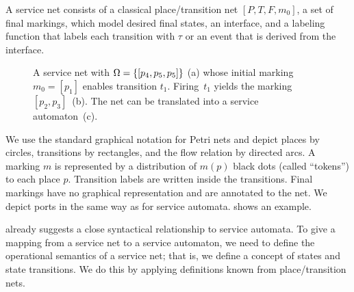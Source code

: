 A service net consists of a classical place/transition net $[P,T,F,m_0]$, a set of final markings, which model desired final states, an interface, and a labeling function that labels each transition with $\tau$ or an event that is derived from the interface.

\begin{figure}
\centering
{}\hfill
{}\hfill
{}
\caption{A service net with $\Omega=\{[p_{4},p_{5},p_{5}]\}$ (a) whose initial marking $m_{0}=[p_{1}]$ enables transition $t_{1}$. Firing~$t_{1}$ yields the marking $[p_{2},p_{3}]$~(b). The net can be translated into a service automaton~(c).}
\end{figure}

We use the standard graphical notation for Petri nets and depict places by circles, transitions by rectangles, and the flow relation by directed arcs. A marking $m$ is represented by a distribution of $m(p)$ black dots (called ``tokens'') to each place $p$. Transition labels are written inside the transitions. Final markings have no graphical representation and are annotated to the net. We depict ports in the same way as for service automata.  shows an example.

 already suggests a close syntactical relationship to service automata. To give a mapping from a service net to a service automaton, we need to define the operational semantics of a service net; that is, we define a concept of states and state transitions. We do this by applying definitions known from place/transition nets.


